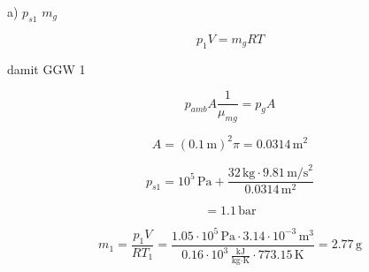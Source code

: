 a) $p_{s1}$ \hspace{1cm} $m_g$

\[ p_1 V = m_g RT \]

damit \hspace{0.5cm} GGW \hspace{0.5cm} 1

\[ p_{amb} A \frac{1}{\mu_{mg}} = p_g A \]

\[ A = (0.1 \, \text{m})^2 \pi = 0.0314 \, \text{m}^2 \]

\[ p_{s1} = 10^5 \, \text{Pa} + \frac{32 \, \text{kg} \cdot 9.81 \, \text{m/s}^2}{0.0314 \, \text{m}^2} \]

\[ = 1.1 \, \text{bar} \]

\[ m_1 = \frac{p_1 V}{RT_1} = \frac{1.05 \cdot 10^5 \, \text{Pa} \cdot 3.14 \cdot 10^{-3} \, \text{m}^3}{0.16 \cdot 10^3 \, \frac{\text{kJ}}{\text{kg} \cdot \text{K}} \cdot 773.15 \, \text{K}} = 2.77 \, \text{g} \]